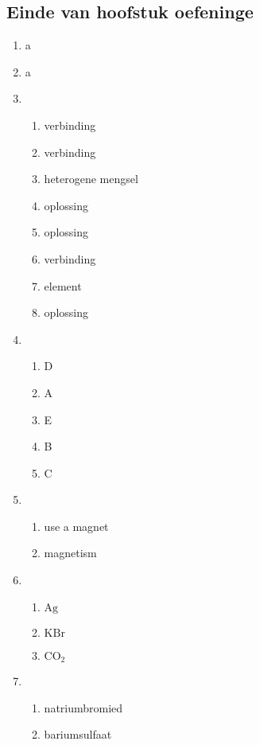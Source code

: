 \subsection{Einde van hoofstuk oefeninge} 
\begin{multicols}{3} 
\begin{enumerate}[itemsep=5pt, label=\textbf{\arabic*}. ] 
\item a
\item a
\item %
\begin{enumerate}[itemsep=6pt,label=\textbf{(\alph*)}]
\item verbinding
\item verbinding
\item heterogene mengsel
\item oplossing
\item oplossing
\item verbinding
\item element
\item oplossing
\end{enumerate}
\item %
\begin{enumerate}[itemsep=5pt,label=\textbf{(\alph*)}]
\item D  
\item A
\item E
\item B
\item C
\end{enumerate}
\item %
\begin{enumerate}[itemsep=5pt,label=\textbf{(\alph*)}]
\item use a magnet
\item magnetism
\end{enumerate}
\item %
\begin{enumerate}[itemsep=5pt,label=\textbf{(\alph*)}]
 \item $\text{Ag}$
 \item $\text{KBr}$
 \item $\text{CO}_{2}$
\end{enumerate}
\item %
\begin{enumerate}[itemsep=5pt,label=\textbf{(\alph*)}]
 \item natriumbromied
 \item bariumsulfaat

\end{enumerate}
\end{enumerate}
\end{multicols}
